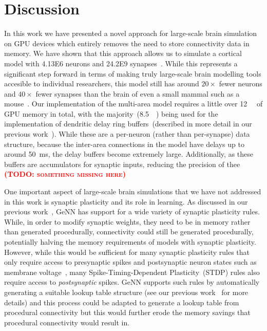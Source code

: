 \documentclass[9pt,twocolumn,twoside,lineno]{pnas-new}
\newcommand{\todo}[1]{\textbf{\textsc{\textcolor{red}{(TODO: #1)}}}}
\begin{document}
\section*{Discussion}
In this work we have presented a novel approach for large-scale brain simulation on GPU devices which entirely removes the need to store connectivity data in memory.
We have shown that this approach allows us to simulate a cortical model with \num{4.13E6} neurons and \num{24.2E9} synapses~\citep{Schmidt2018a,Schmidt2018}.
While this represents a significant step forward in terms of making truly large-scale brain modelling tools accesible to individual researchers, this model still has around $20\times$ fewer neurons and $40\times$ fewer synapses than the brain of even a small mammal such as a mouse~\citep{Herculano-Houzel2010}.
Our implementation of the multi-area model requires a little over \SI{12}{\giga\byte} of GPU memory in total, with the majority~(\SI{8.5}{\giga\byte}) being used for the implementation of dendritic delay ring buffers~(described in more detail in our previous work~\citep{Knight2018}).
While these are a per-neuron (rather than per-synapse) data structure, because the inter-area connections in the model have delays up to around \SI{50}{\milli\second}, the delay buffers become extremely large.
Additionally, as these buffers are accumulators for synaptic inputs, reducing the precision of thee \todo{something missing here}

One important aspect of large-scale brain simulations that we have not addressed in this work is synaptic plasticity and its role in learning.
As discussed in our previous work~\citep{Knight2018}, GeNN has support for a wide variety of synaptic plasticity rules.
While, in order to modify synaptic weights, they need to be in memory rather than generated procedurally, connectivity could still be generated procedurally, potentially halving the memory requirements of models with synaptic plasticity.
However, while this would be sufficient for many synaptic plasticity rules that only require access to presynaptic spikes and postsynaptic neuron states such as membrane voltage~\cite{Brader2007,Clopath2010c}, many Spike-Timing-Dependent Plasticity~(STDP) rules also require access to \emph{postsynaptic} spikes.
GeNN supports such rules by automatically generating a suitable lookup table structure (see our previous work~\citep{Knight2018} for more details) and this process could be adapted to generate a lookup table from procedural connectivity but this would further erode the memory savings that procedural connectivity would result in.
\end{document}
